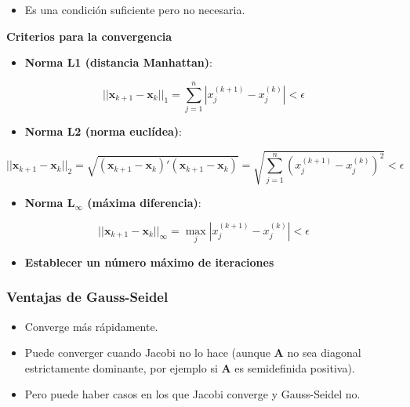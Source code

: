 \documentclass[openany]{book}
\providecommand{\tightlist}{%
  \setlength{\itemsep}{0pt}\setlength{\parskip}{0pt}}
\begin{document}
\begin{itemize}
\tightlist
\item
  Es una condición suficiente pero no necesaria.
\end{itemize}

\textbf{Criterios para la convergencia}

\begin{itemize}
\tightlist
\item
  \textbf{Norma L1 (distancia Manhattan)}:
\end{itemize}

\[
||\mathbf{x}_{k+1}-\mathbf{x}_{k}||_1 =\sum_{j=1}^n |x_j^{(k+1)} - x_j^{(k)}| < \epsilon
\]

\begin{itemize}
\tightlist
\item
  \textbf{Norma L2 (norma euclídea)}:
\end{itemize}

\[||\mathbf{x}_{k+1}-\mathbf{x}_{k}||_2 = \sqrt{(\mathbf{x}_{k+1}-\mathbf{x}_{k})'(\mathbf{x}_{k+1}-\mathbf{x}_{k})} = \sqrt{\sum_{j=1}^n (x_j^{(k+1)} - x_j^{(k)})^2} < \epsilon\]

\begin{itemize}
\tightlist
\item
  \textbf{Norma L\(_\infty\) (máxima diferencia)}:
\end{itemize}

\[
||\mathbf{x}_{k+1}-\mathbf{x}_{k}||_\infty = \max_{j} |x_j^{(k+1)} - x_j^{(k)}| < \epsilon
\]

\begin{itemize}
\tightlist
\item
  \textbf{Establecer un número máximo de iteraciones}
\end{itemize}

\hypertarget{ventajas-de-gauss-seidel}{%
\subsubsection{Ventajas de Gauss-Seidel}\label{ventajas-de-gauss-seidel}}

\begin{itemize}
\tightlist
\item
  Converge más rápidamente.
\item
  Puede converger cuando Jacobi no lo hace (aunque \(\mathbf{A}\) no sea diagonal estrictamente dominante, por ejemplo si \(\mathbf{A}\) es semidefinida positiva).
\item
  Pero puede haber casos en los que Jacobi converge y Gauss-Seidel no.
\end{itemize}
\end{document}
